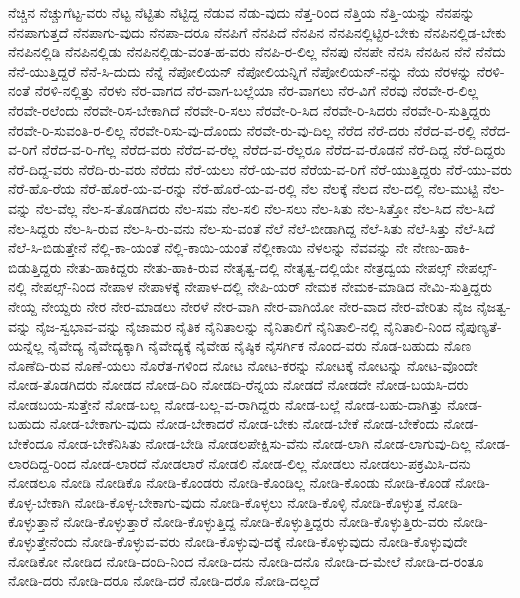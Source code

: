 {ನೆಚ್ಚಿನ
ನೆಚ್ಚುಗೆಟ್ಟ-ವರು
ನೆಟ್ಟ
ನೆಟ್ಟಿತು
ನೆಟ್ಟಿದ್ದ
ನೆಡುವ
ನೆಡು-ವುದು
ನೆತ್ತ-ರಿಂದ
ನೆತ್ತಿಯ
ನೆತ್ತಿ-ಯನ್ನು
ನೆನಪನ್ನು
ನೆನಪಾಗುತ್ತದೆ
ನೆನಪಾಗು-ವುದು
ನೆನಪಾ-ದರೂ
ನೆನಪಿಗೆ
ನೆನಪಿದೆ
ನೆನಪಿನ
ನೆನಪಿನಲ್ಲಿಟ್ಟಿರ-ಬೇಕು
ನೆನಪಿನಲ್ಲಿಡ-ಬೇಕು
ನೆನಪಿನಲ್ಲಿಡಿ
ನೆನಪಿನಲ್ಲಿಡು
ನೆನಪಿನಲ್ಲಿಡು-ವಂತ-ಹ-ವರು
ನೆನಪಿ-ರ-ಲಿಲ್ಲ
ನೆನಪು
ನೆನಪೇ
ನೆನಸಿ
ನೆನಹಿನ
ನೆನೆ
ನೆನೆದು
ನೆನೆ-ಯುತ್ತಿದ್ದರೆ
ನೆನೆ-ಸಿ-ದುದು
ನೆನ್ನೆ
ನೆಪೋಲಿಯನ್
ನೆಪೋಲಿಯನ್ನಿಗೆ
ನೆಪೋಲಿಯನ್-ನನ್ನು
ನೆಯ
ನೆರಳನ್ನು
ನೆರಳಿ-ನಂತೆ
ನೆರಳಿ-ನಲ್ಲಿತ್ತು
ನೆರಳು
ನೆರ-ವಾಗದ
ನೆರ-ವಾಗ-ಬಲ್ಲೆಯಾ
ನೆರ-ವಾಗಲು
ನೆರ-ವಿಗೆ
ನೆರವು
ನೆರವೇ-ರ-ಲಿಲ್ಲ
ನೆರವೇ-ರಲೆಂದು
ನೆರವೇ-ರಿಸ-ಬೇಕಾಗಿದೆ
ನೆರವೇ-ರಿ-ಸಲು
ನೆರವೇ-ರಿ-ಸಿದ
ನೆರವೇ-ರಿ-ಸಿದರು
ನೆರವೇ-ರಿ-ಸುತ್ತಿದ್ದರು
ನೆರವೇ-ರಿ-ಸುವಂತಿ-ರ-ಲಿಲ್ಲ
ನೆರವೇ-ರಿಸು-ವು-ದೊಂದು
ನೆರವೇ-ರು-ವು-ದಿಲ್ಲ
ನೆರೆದ
ನೆರೆ-ದರು
ನೆರೆದ-ವ-ರಲ್ಲಿ
ನೆರೆದ-ವ-ರಿಗೆ
ನೆರೆದ-ವ-ರಿ-ಗೆಲ್ಲ
ನೆರೆದ-ವರು
ನೆರೆದ-ವ-ರೆಲ್ಲ
ನೆರೆದ-ವ-ರೆಲ್ಲರೂ
ನೆರೆದ-ವ-ರೊಡನೆ
ನೆರೆ-ದಿದ್ದ
ನೆರೆ-ದಿದ್ದರು
ನೆರೆ-ದಿದ್ದ-ವರು
ನೆರೆದಿ-ರು-ವರು
ನೆರೆದು
ನೆರೆ-ಯಲು
ನೆರೆ-ಯ-ವರ
ನೆರೆಯ-ವ-ರಿಗೆ
ನೆರೆ-ಯುತ್ತಿದ್ದರು
ನೆರೆ-ಯು-ವರು
ನೆರೆ-ಹೊ-ರೆಯ
ನೆರೆ-ಹೊರೆ-ಯ-ವ-ರನ್ನು
ನೆರೆ-ಹೊರೆ-ಯ-ವ-ರಲ್ಲಿ
ನೆಲ
ನೆಲಕ್ಕೆ
ನೆಲದ
ನೆಲ-ದಲ್ಲಿ
ನೆಲ-ಮುಟ್ಟಿ
ನೆಲ-ವನ್ನು
ನೆಲ-ವೆಲ್ಲ
ನೆಲ-ಸ-ತೊಡಗಿದರು
ನೆಲ-ಸಮ
ನೆಲ-ಸಲಿ
ನೆಲ-ಸಲು
ನೆಲ-ಸಿತು
ನೆಲ-ಸಿತ್ತೋ
ನೆಲ-ಸಿದ
ನೆಲ-ಸಿದೆ
ನೆಲ-ಸಿದ್ದರು
ನೆಲ-ಸಿ-ರುವ
ನೆಲ-ಸಿ-ರು-ವನು
ನೆಲ-ಸು-ವಂತೆ
ನೆಲೆ
ನೆಲೆ-ಬೀಡಾಗಿದ್ದ
ನೆಲೆ-ಸಿತು
ನೆಲೆ-ಸಿತ್ತು
ನೆಲೆ-ಸಿದೆ
ನೆಲೆ-ಸಿ-ಬಿಡುತ್ತೇನೆ
ನೆಲ್ಲಿ-ಕಾ-ಯಂತೆ
ನೆಲ್ಲಿ-ಕಾಯಿ-ಯಂತೆ
ನೆಲ್ಲೀಕಾಯಿ
ನೆಳಲನ್ನು
ನೆವವನ್ನು
ನೇ
ನೇಣು-ಹಾಕಿ-ಬಿಡುತ್ತಿದ್ದರು
ನೇತು-ಹಾಕಿದ್ದರು
ನೇತು-ಹಾಕಿ-ರುವ
ನೇತೃತ್ವ-ದಲ್ಲಿ
ನೇತೃತ್ವ-ದಲ್ಲಿಯೇ
ನೇತ್ರದ್ವಯ
ನೇಪಲ್ಸ್
ನೇಪಲ್ಸ್-ನಲ್ಲಿ
ನೇಪಲ್ಸ್-ನಿಂದ
ನೇಪಾಳ
ನೇಪಾಳಕ್ಕೆ
ನೇಪಾಳ-ದಲ್ಲಿ
ನೇಪಿ-ಯರ್
ನೇಮಕ
ನೇಮಕ-ಮಾಡಿದ
ನೇಮಿ-ಸುತ್ತಿದ್ದರು
ನೇಯ್ದ
ನೇಯ್ದರು
ನೇರ
ನೇರ-ಮಾಡಲು
ನೇರಳೆ
ನೇರ-ವಾಗಿ
ನೇರ-ವಾಗಿಯೋ
ನೇರ-ವಾದ
ನೇರ-ವೇರಿತು
ನೈಜ
ನೈಜತ್ವ-ವನ್ನು
ನೈಜ-ಸ್ವಭಾವ-ವನ್ನು
ನೈಜಾಮರ
ನೈತಿಕ
ನೈನಿತಾಲನ್ನು
ನೈನಿತಾಲಿಗೆ
ನೈನಿತಾಲಿ-ನಲ್ಲಿ
ನೈನಿತಾಲಿ-ನಿಂದ
ನೈಪುಣ್ಯತೆ-ಯನ್ನೆಲ್ಲ
ನೈವೇದ್ಯ
ನೈವೇದ್ಯಕ್ಕಾಗಿ
ನೈವೇದ್ಯಕ್ಕೆ
ನೈವೇಹ
ನೈಷ್ಠಿಕ
ನೈಸರ್ಗಿಕ
ನೊಂದ-ವರು
ನೊಡ-ಬಹುದು
ನೊಣ
ನೊಣೆದಿ-ರುವ
ನೊಣೆ-ಯಲು
ನೊರೆತ-ಗಳಿಂದ
ನೋಟ
ನೋಟ-ಕರನ್ನು
ನೋಟಕ್ಕೆ
ನೋಟನ್ನು
ನೋಟ-ವೊಂದೇ
ನೋಡ-ತೊಡಗಿದರು
ನೋಡದ
ನೋಡ-ದಿರಿ
ನೋಡದಿ-ರೆನ್ನಯ
ನೋಡದೆ
ನೋಡದೇ
ನೋಡ-ಬಯಸಿ-ದರು
ನೋಡಬಯ-ಸುತ್ತೇನೆ
ನೋಡ-ಬಲ್ಲ
ನೋಡ-ಬಲ್ಲ-ವ-ರಾಗಿದ್ದರು
ನೋಡ-ಬಲ್ಲೆ
ನೋಡ-ಬಹು-ದಾಗಿತ್ತು
ನೋಡ-ಬಹುದು
ನೋಡ-ಬೇಕಾಗು-ವುದು
ನೋಡ-ಬೇಕಾದರೆ
ನೋಡ-ಬೇಕು
ನೋಡ-ಬೇಕೆ
ನೋಡ-ಬೇಕೆಂದು
ನೋಡ-ಬೇಕೆಂದೂ
ನೋಡ-ಬೇಕೆನಿಸಿತು
ನೋಡ-ಬೇಡಿ
ನೋಡಲಪೇಕ್ಷಿಸು-ವೆನು
ನೋಡ-ಲಾಗಿ
ನೋಡ-ಲಾಗುವು-ದಿಲ್ಲ
ನೋಡ-ಲಾರದಿದ್ದ-ರಿಂದ
ನೋಡ-ಲಾರದೆ
ನೋಡಲಾರೆ
ನೋಡಲಿ
ನೋಡ-ಲಿಲ್ಲ
ನೋಡಲು
ನೋಡಲು-ಪಕ್ರಮಿಸಿ-ದನು
ನೋಡಲೂ
ನೋಡಿ
ನೋಡಿಕೊ
ನೋಡಿ-ಕೊಂಡರು
ನೋಡಿ-ಕೊಂಡಿಲ್ಲ
ನೋಡಿ-ಕೊಂಡು
ನೋಡಿ-ಕೊಂಡೆ
ನೋಡಿ-ಕೊಳ್ಳ-ಬೇಕಾಗಿ
ನೋಡಿ-ಕೊಳ್ಳ-ಬೇಕಾಗು-ವುದು
ನೋಡಿ-ಕೊಳ್ಳಲು
ನೋಡಿ-ಕೊಳ್ಳಿ
ನೋಡಿ-ಕೊಳ್ಳುತ್ತ
ನೋಡಿ-ಕೊಳ್ಳುತ್ತಾನೆ
ನೋಡಿ-ಕೊಳ್ಳುತ್ತಾರೆ
ನೋಡಿ-ಕೊಳ್ಳುತ್ತಿದ್ದ
ನೋಡಿ-ಕೊಳ್ಳುತ್ತಿದ್ದರು
ನೋಡಿ-ಕೊಳ್ಳುತ್ತಿರು-ವರು
ನೋಡಿ-ಕೊಳ್ಳುತ್ತೇನೆಂದು
ನೋಡಿ-ಕೊಳ್ಳುವ-ವರು
ನೋಡಿ-ಕೊಳ್ಳುವು-ದಕ್ಕೆ
ನೋಡಿ-ಕೊಳ್ಳುವುದು
ನೋಡಿ-ಕೊಳ್ಳುವುದೇ
ನೋಡಿಕೋ
ನೋಡಿದ
ನೋಡಿ-ದಂದಿ-ನಿಂದ
ನೋಡಿ-ದನು
ನೋಡಿ-ದನೊ
ನೋಡಿ-ದ-ಮೇಲೆ
ನೋಡಿ-ದ-ರಂತೂ
ನೋಡಿ-ದರು
ನೋಡಿ-ದರೂ
ನೋಡಿ-ದರೆ
ನೋಡಿ-ದರೊ
ನೋಡಿ-ದಲ್ಲದೆ
}

